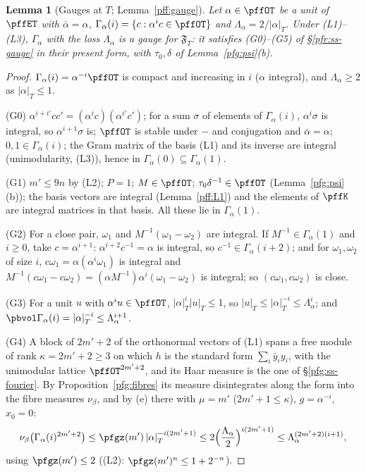 \documentclass[10pt]{amsart}
\newtheorem{lemma}[theorem]{Lemma}
\theoremstyle{definition}
\theoremstyle{remark}
\begin{document}
\begin{lemma}[Gauges at $T$; Lemma~\ref{pff:gauge}]\label{pfg:gauge}
Let $\alpha\in\pffOT$ be a unit of $\pffET$ with $\bar\alpha=\alpha$, $\Gamma_\alpha(i)=\{c:\alpha^ic\in\pffOT\}$ and
$\Lambda_\alpha=2/|\alpha|_T$. Under (L1)--(L3), $\Gamma_\alpha$ with the loss $\Lambda_\alpha$ is a gauge for $\mathfrak F_T$:
it satisfies (G0)--(G5) of \S\ref{pfr:ss-gauge} in their present form, with $\tau_0,\delta$ of Lemma~\ref{pfg:psi}(b).
\end{lemma}
\begin{proof}
$\Gamma_\alpha(i)=\alpha^{-i}\pffOT$ is compact and increasing in $i$ ($\alpha$ integral), and $\Lambda_\alpha\ge2$ as
$|\alpha|_T\le1$.

(G0) $\alpha^{i+i'}cc'=(\alpha^ic)(\alpha^{i'}c')$; for a sum $\sigma$ of elements of $\Gamma_\alpha(i)$, $\alpha^i\sigma$ is
integral, so $\alpha^{i+1}\sigma$ is; $\pffOT$ is stable under $-$ and conjugation and $\bar\alpha=\alpha$; $0,1\in
\Gamma_\alpha(i)$; the Gram matrix of the basis (L1) and its inverse are integral (unimodularity, (L3)), hence in
$\Gamma_\alpha(0)\subseteq\Gamma_\alpha(1)$.

(G1) $m'\le9n$ by (L2); $P=1$; $M\in\pffOT$; $\tau_0\delta^{-1}\in\pffOT$ (Lemma~\ref{pfg:psi}(b)); the basis vectors are
integral (Lemma~\ref{pff:L1}) and the elements of $\pffK$ are integral matrices in that basis. All these lie in
$\Gamma_\alpha(1)$.

(G2) For a close pair, $\omega_1$ and $M^{-1}(\omega_1-\omega_2)$ are integral. If $M^{-1}\in\Gamma_\alpha(1)$ and $i\ge0$,
take $c=\alpha^{i+1}$: $\alpha^{i+2}c^{-1}=\alpha$ is integral, so $c^{-1}\in\Gamma_\alpha(i+2)$; and for $\omega_1,\omega_2$ of
size $i$, $c\omega_1=\alpha(\alpha^i\omega_1)$ is integral and $M^{-1}(c\omega_1-c\omega_2)=(\alpha M^{-1})\alpha^i(\omega_1-\omega_2)$
is integral; so $(c\omega_1,c\omega_2)$ is close.

(G3) For a unit $u$ with $\alpha^iu\in\pffOT$, $|\alpha|_T^i|u|_T\le1$, so $|u|_T\le|\alpha|_T^{-i}\le\Lambda_\alpha^i$; and
$\pbvol\Gamma_\alpha(i)=|\alpha|_T^{-i}\le\Lambda_\alpha^{i+1}$.

(G4) A block of $2m'+2$ of the orthonormal vectors of (L1) spans a free module of rank $\kappa=2m'+2\ge3$ on which
$h$ is the standard form $\sum_i\bar y_iy_i$, with the unimodular lattice $\pffOT^{2m'+2}$, and its Haar measure is the one of \S\ref{pfg:ss-fourier}. By Proposition~\ref{pfg:fibres} its
measure disintegrates along the form into the fibre measures $\nu_\beta$, and by (e) there with $\mu=m'$
($2m'+1\le\kappa$), $g=\alpha^{-i}$, $x_0=0$:
\[
\nu_\beta\bigl(\Gamma_\alpha(i)^{2m'+2}\bigr)\le\pfgz(m')\,|\alpha|_T^{-i(2m'+1)}\le2\Bigl(\frac{\Lambda_\alpha}2\Bigr)^{i(2m'+1)}
\le\Lambda_\alpha^{(2m'+2)(i+1)},
\]
using $\pfgz(m')\le2$ ((L2): $\pfgz(m')^n\le1+2^{-n}$).


\end{proof}
\end{document}

